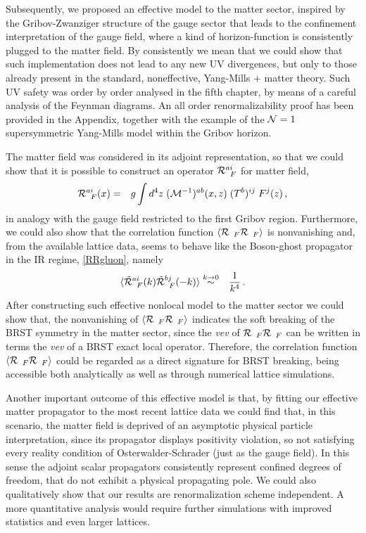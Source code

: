 Subsequently, we proposed an effective model to the matter sector, inspired by the
Gribov-Zwanziger structure of the gauge sector that leads to the confinement interpretation of
the gauge field, where a kind of horizon-function is consistently plugged to the matter field.
By consistently we mean that we could show that such implementation does not lead to any new UV
divergences, but only to those already present in the standard, noneffective, Yang-Mills +
matter theory. Such UV safety was order by order analysed in the fifth chapter, by means of a
careful analysis of the Feynman diagrams. An all order renormalizability proof has been
provided in the Appendix, together with the example of the ${\cal N}=1$ supersymmetric
Yang-Mills model within the Gribov horizon.

The matter field was considered in its adjoint representation, so that we could show that it is
possible to construct an operator ${\cal R}^{ai}_{\;\;F}$ for matter field,
\begin{eqnarray}
{\cal R}^{ai}_{\;\;F}(x)  &=&  g \int d^4z\;  ({\cal M}^{-1})^{ab} (x,z)   \;(T^b)^{ij}
\;F^{j}(z)  
\,,
\end{eqnarray}
in analogy with the gauge field restricted to the first Gribov region.
Furthermore, we could also show that the correlation function $\langle{\cal R}_{\;\;F}{\cal
R}_{\;\;F}\rangle$ is nonvanishing and, from the available lattice data, seems to behave like
the Boson-ghost propagator in the IR regime, \eqref{RRgluon}, namely
\begin{eqnarray}
\langle \tilde {\cal R}^{ai}_{\;\;F}(k)\tilde {\cal R}^{bj}_{\;\;F}(-k)\rangle&\stackrel{k\to
0}{\sim}&\frac{1}{k^4} 
\,.
\end{eqnarray}
After constructing such effective nonlocal model to the matter sector we could show that, the
nonvanishing of $\langle{\cal R}_{\;\;F}{\cal R}_{\;\;F}\rangle$ indicates the soft breaking
of the BRST symmetry in the matter sector, since the \emph{vev} of ${\cal R}_{\;\;F}{\cal
R}_{\;\;F}$ can be written in terms the \emph{vev} of a BRST exact local operator. Therefore,
the correlation function $\langle{\cal R}_{\;\;F}{\cal R}_{\;\;F}\rangle$ could be regarded as
a direct signature for BRST breaking, being accessible both analytically as well as through
numerical lattice simulations.

Another important outcome of this effective model is that, by fitting our effective matter
propagator to the most recent lattice data we could find that, in this scenario, the matter
field is deprived of an asymptotic physical particle interpretation, since its propagator
displays positivity violation, so not satisfying every reality condition of
Osterwalder-Schrader (just as the gauge field). In this sense the adjoint scalar
propagators  consistently represent confined degrees of freedom, that do not exhibit a physical
propagating pole. We could also qualitatively show that our results are renormalization scheme
independent. A more quantitative analysis would require further simulations with improved
statistics and even larger lattices.



